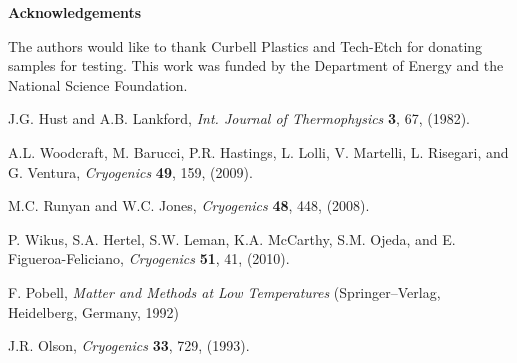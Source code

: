 \documentclass[final]{svjour2}
\begin{document}
\noindent \textbf{Acknowledgements}

\noindent The authors would like to thank Curbell Plastics and Tech-Etch for donating samples for testing. This work was funded by the Department of Energy and the National Science Foundation.

\begin{thebibliography}{99}

J.G. Hust and A.B. Lankford, {\it Int. Journal of Thermophysics} \textbf{3}, 67, (1982).

A.L. Woodcraft, M. Barucci, P.R. Hastings, L. Lolli, V. Martelli, L. Risegari, and G. Ventura, {\it Cryogenics} \textbf{49}, 159, (2009).

M.C. Runyan and W.C. Jones, {\it Cryogenics} \textbf{48}, 448, (2008).

P. Wikus, S.A. Hertel, S.W. Leman, K.A. Mc{C}arthy, S.M. Ojeda, and E. Figueroa-{F}eliciano, {\it Cryogenics} \textbf{51}, 41, (2010).

F. Pobell, {\it Matter and Methods at Low Temperatures} (Springer--Verlag, Heidelberg, Germany, 1992)

J.R. Olson, {\it Cryogenics} \textbf{33}, 729, (1993).

\end{thebibliography}
\end{document}

